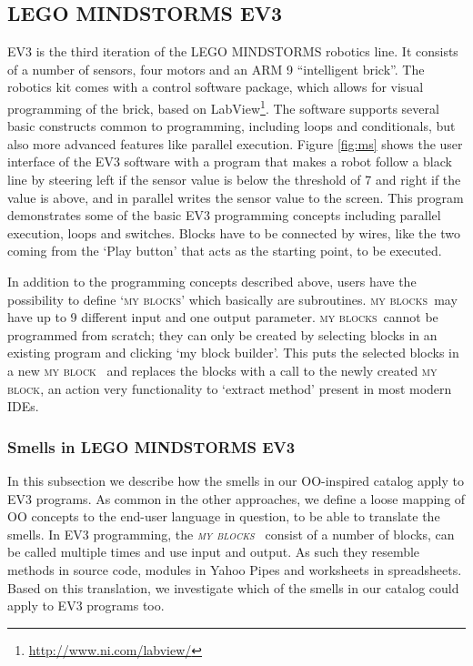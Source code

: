 \documentclass{sig-alternate}
\newcommand{\ms}{LEGO MINDSTORMS EV3}
\newcommand{\mbs}{\textsc{my blocks}}
\newcommand{\mb}{\textsc{my block}}
\begin{document}
\subsection{\ms}
EV3 is the third iteration of the LEGO MINDSTORMS robotics line. It consists of a number of sensors, four motors and an ARM 9 ``intelligent brick''. The robotics kit comes with a control software package, which allows for visual programming of the brick, based on LabView\footnote{\url{http://www.ni.com/labview/}}. The software supports several basic constructs common to programming, including loops and conditionals, but also more advanced features like parallel execution. Figure \ref{fig:ms} shows the user interface of the EV3 software with a program that makes a robot follow a black line by steering left if the sensor value is below the threshold of 7 and right if the value is above, and in parallel writes the sensor value to the screen. This program demonstrates some of the basic EV3 programming concepts including parallel execution, loops and switches. Blocks have to be connected by wires, like the two coming from the `Play button' that acts as the starting point, to be executed. 

In addition to the programming concepts described above, users have the possibility to define `\mbs' which basically are subroutines. \mbs~may have up to 9 different input and one output parameter. \mbs~cannot be programmed from scratch; they can only be created by selecting blocks in an existing program and clicking `my block builder'. This puts the selected blocks in a new \mb~ and replaces the blocks with a call to the newly created \mb, an action very functionality to `extract method' present in most modern IDEs. 

\subsubsection{Smells in \ms}
In this subsection we describe how the smells in our OO-inspired catalog apply to EV3 programs. As common in the other approaches, we define a loose mapping of OO concepts to the end-user language in question, to be able to translate the smells. In EV3 programming, the \emph{\mbs~} consist of a number of blocks, can be called multiple times and use input and output. As such they resemble methods in source code, modules in Yahoo Pipes and worksheets in spreadsheets. Based on this translation, we investigate which of the smells in our catalog could apply to EV3 programs too. 
\end{document}
